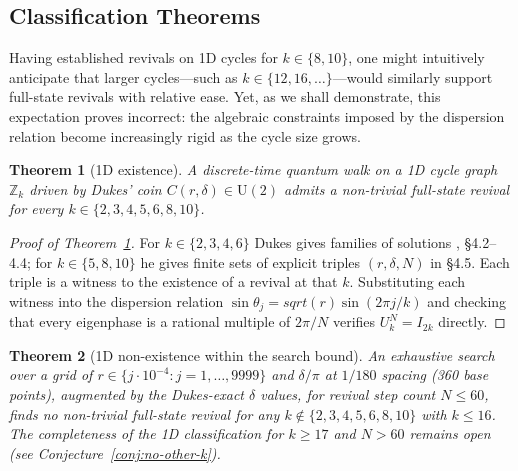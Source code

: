 \documentclass[aps,pra,reprint,amsmath,amssymb,superscriptaddress,floatfix]{revtex4-2}
\newcommand{\Nmax}{60}
\newcommand{\Kmax}{16}
\def\rho{r}%
\def\sqrt#1{sqrt(#1)}%
\newtheorem{theorem}{Theorem}
\begin{document}
\subsection{Classification Theorems}\par
Having established revivals on 1D cycles for \(k \in \{8,10\}\), one
might intuitively anticipate that larger cycles---such as
\(k \in \{12,16,\dots\}\)---would similarly support full-state revivals
with relative ease. Yet, as we shall demonstrate, this expectation
proves incorrect: the algebraic constraints imposed by the dispersion
relation become increasingly rigid as the cycle size grows.
\par
\begin{theorem}[1D existence]
\label{thm:1d-existence}
A discrete-time quantum walk on a 1D cycle graph
$\mathbb{Z}_k$ driven by Dukes' coin $C(\rho, \delta) \in
\mathrm{U}(2)$ admits a non-trivial full-state revival for
every $k \in \{2, 3, 4, 5, 6, 8, 10\}$.
\end{theorem}
\par
\begin{proof}[Proof of Theorem~\ref{thm:1d-existence}]
For $k \in \{2, 3, 4, 6\}$ Dukes gives families of solutions
\cite{Dukes2014}, \S4.2--4.4; for $k \in \{5, 8, 10\}$ he gives finite
sets of explicit triples $(\rho, \delta, N)$ in \S4.5. Each triple is
a witness to the existence of a revival at that $k$. Substituting each
witness into the dispersion relation
$\sin\theta_j = \sqrt{\rho}\sin(2\pi j/k)$ and checking that every
eigenphase is a rational multiple of $2\pi/N$ verifies
$U_k^N = I_{2k}$ directly.
\end{proof}
\par
\begin{theorem}[1D non-existence within the search bound]
\label{thm:1d-nonexistence}
An exhaustive search over a grid of $\rho \in \{j \cdot
10^{-4} : j = 1, \ldots, 9999\}$ and $\delta/\pi$ at $1/180$
spacing (360 base points), augmented by the Dukes-exact
$\delta$ values, for revival step count $N \le \Nmax$, finds no
non-trivial full-state revival for any $k \notin \{2, 3, 4,
5, 6, 8, 10\}$ with $k \le \Kmax$. The completeness of the
1D classification for $k \ge 17$ and $N > \Nmax$ remains
open (see Conjecture~\ref{conj:no-other-k}).
\end{theorem}
\par
\end{document}
